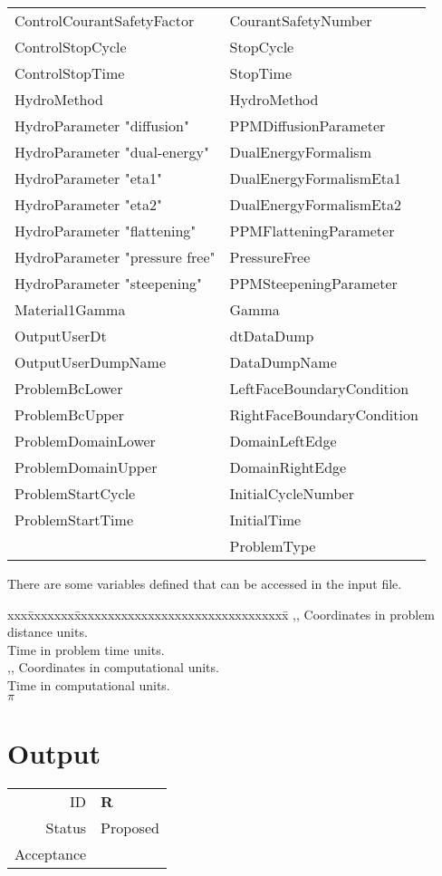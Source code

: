\documentclass{book}
\newcommand{\req}[3]{
\begin{tabular}{rl}
ID & \textbf{R#1} \\
Status & \textsf{#2} \\
Acceptance & \textit{#3}
\end{tabular}
}
\begin{document}
\begin{tabular}{ll}
ControlCourantSafetyFactor        & CourantSafetyNumber \\
ControlStopCycle           & StopCycle \\
ControlStopTime            & StopTime \\
HydroMethod                & HydroMethod \\
HydroParameter "diffusion"    & PPMDiffusionParameter \\
HydroParameter "dual-energy"  & DualEnergyFormalism \\
HydroParameter "eta1"    & DualEnergyFormalismEta1 \\
HydroParameter "eta2"    & DualEnergyFormalismEta2 \\
HydroParameter "flattening"   & PPMFlatteningParameter \\
HydroParameter "pressure free" & PressureFree \\
HydroParameter "steepening"  & PPMSteepeningParameter \\
Material1Gamma             & Gamma \\
OutputUserDt               & dtDataDump \\
OutputUserDumpName         & DataDumpName \\
ProblemBcLower             & LeftFaceBoundaryCondition \\
ProblemBcUpper             & RightFaceBoundaryCondition \\
ProblemDomainLower         & DomainLeftEdge \\
ProblemDomainUpper         & DomainRightEdge \\
ProblemStartCycle          & InitialCycleNumber \\
ProblemStartTime           & InitialTime \\
                           & ProblemType \\
\end{tabular}

There are some variables defined that can be accessed in the input file.
\begin{tabbing}
xxx\=xxxxxxx\=xxxxxxxxxxxxxxxxxxxxxxxxxxxxxxxx\=\kill
\> ,, \> Coordinates in problem distance units. \\
\>  \> Time in problem time units. \\
\> ,, \> Coordinates in computational units. \\
\>  \> Time in computational units. \\
\>  \> $\pi$ \\
\end{tabbing}

\section{Output}

\req
  {}
  {Proposed}
%
  {}

\appendix
\end{document}

